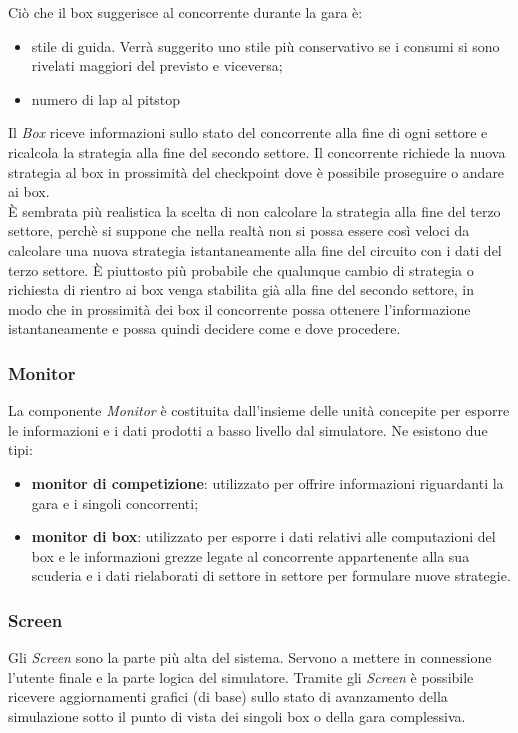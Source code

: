 Ci\`{o} che il box suggerisce al concorrente durante la gara \`{e}:
	\begin{itemize}
		\item stile di guida. Verr\`{a} suggerito uno stile pi\`{u} conservativo se i consumi si sono rivelati maggiori del previsto e viceversa;
		\item numero di lap al pitstop
	\end{itemize}
Il \emph{Box} riceve informazioni sullo stato del concorrente alla fine di ogni settore e ricalcola la strategia alla fine del secondo settore. Il concorrente
richiede la nuova strategia al box in prossimit\`{a} del checkpoint dove \`{e} possibile proseguire o andare ai box.\\
\`{E} sembrata pi\`{u} realistica la scelta di non calcolare la strategia alla fine del terzo settore, perch\`{e} si suppone che nella realt\`{a} non si possa essere
cos\`{i} veloci da calcolare una nuova strategia istantaneamente alla fine del circuito con i dati del terzo settore. \`{E} piuttosto pi\`{u} probabile che 
qualunque cambio di strategia o richiesta di rientro ai box venga stabilita gi\`{a} alla fine del secondo settore, in modo che in prossimit\`{a} dei box il concorrente
possa ottenere l'informazione istantaneamente e possa quindi decidere come e dove procedere.
\subsubsection{Monitor}
La componente \emph{Monitor} \`{e} costituita dall'insieme delle unit\`{a} concepite per esporre le informazioni e i dati prodotti a basso livello
dal simulatore. Ne esistono due tipi:
\begin{itemize}
	\item \textbf{monitor di competizione}: utilizzato per offrire informazioni riguardanti la gara e i singoli concorrenti;
	\item \textbf{monitor di box}: utilizzato per esporre i dati relativi alle computazioni del box e le informazioni grezze legate al
		concorrente appartenente alla sua scuderia e i dati rielaborati di settore in settore per formulare nuove strategie.
\end{itemize}
\subsubsection{Screen} 
Gli \emph{Screen} sono la parte pi\`{u} alta del sistema. Servono a mettere in connessione l'utente finale e la parte logica del simulatore.
Tramite gli \emph{Screen} \`{e} possibile ricevere aggiornamenti grafici (di base) sullo stato di avanzamento della simulazione sotto il punto di vista 
dei singoli box o della gara complessiva.
